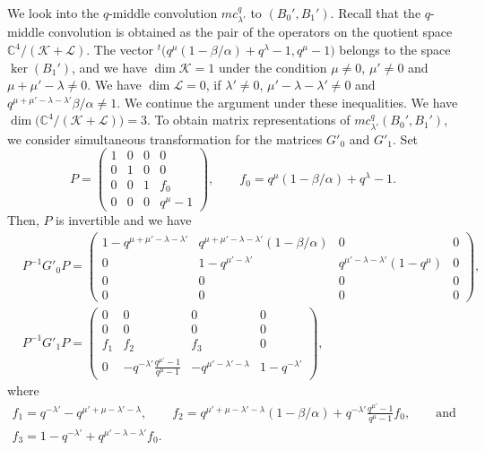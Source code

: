 \documentclass[pdftex]{sigma}
\numberwithin{equation}{section}
\theoremstyle{definition}
\begin{document}
We look into the $q$-middle convolution $mc^q_{\lambda'}$ to $(B_0', B_1')$.
Recall that the $q$-middle convolution is obtained as the pair of the operators on the quotient space $\mathbb{C}^4/(\mathcal{K} + \mathcal{L}) $.
The vector ${}^t\bigl(q^{\mu}(1-\beta/\alpha)+q^{\lambda}-1, q^{\mu}-1\bigr)$ belongs to the space $\ker (B_1')$, and we have $\dim \mathcal{K}=1$ under the condition ${\mu \neq 0}$, $ \mu ' \neq 0$ and $\mu+\mu'-\lambda \neq 0 $.
We have $\dim \mathcal{L}=0$, if $\lambda ' \neq 0$, $\mu'-\lambda-\lambda' \neq 0$ and $q^{\mu + \mu' -\lambda-\lambda'} \beta /\alpha \neq 1 $.
We continue the argument under these inequalities.
We have $\dim \bigl(\mathbb{C}^4/(\mathcal{K} + \mathcal{L}) \bigr) =3 $.
To obtain matrix representations of $mc^q_{\lambda'} (B_0', B_1') $, we consider simultaneous transformation for the matrices $G'_0 $ and $G' _1$.
Set
\begin{equation*} %
P = \begin{pmatrix}
 1 & 0 & 0 & 0 \\
 0 & 1 & 0 & 0 \\
 0 & 0 & 1 & f_0 \\
 0 & 0 & 0 & q^{\mu}-1
\end{pmatrix},\qquad f_0 = q^{\mu}(1 - \beta/\alpha)+q^{\lambda}-1.
\end{equation*}
Then, $P$ is invertible and we have
\begin{align*}
& P^{-1}G'_0 P = \begin{pmatrix}
 1-q^{\mu+\mu'-\lambda-\lambda'} & q^{\mu+\mu'-\lambda-\lambda'}(1 - \beta/\alpha) & 0 & 0 \\
 0 & 1-q^{\mu'-\lambda'} & q^{\mu'-\lambda-\lambda'} (1 - q^{\mu })& 0 \\
 0 & 0 & 0 & 0 \\
 0 & 0 & 0 & 0
 \end{pmatrix}, \\
& P^{-1}G'_1 P
= \begin{pmatrix}
 0 & 0 & 0 & 0 \\
 0 & 0 & 0 & 0 \\
 f_1 & f_2 & f_3 & 0 \\
 0 & -q^{-\lambda '}\frac{q^{\mu '}-1}{q^{\mu } -1} & -q^{\mu ' - \lambda ' - \lambda } & 1-q^{-\lambda '}
 \end{pmatrix},
\end{align*}
where
\begin{gather*}
f_1 = q^{-\lambda '} - q^{\mu ' +\mu - \lambda '- \lambda}, \qquad f_2 = q^{\mu ' +\mu - \lambda '- \lambda} (1 - \beta/\alpha) + q^{-\lambda'} \frac{q^{\mu '} -1}{q^{\mu } -1 } f_0,\qquad\text{and} \\ f_3 = 1 - q^{-\lambda'} + q^{\mu'-\lambda-\lambda'} f_0.
\end{gather*}
\end{document}
